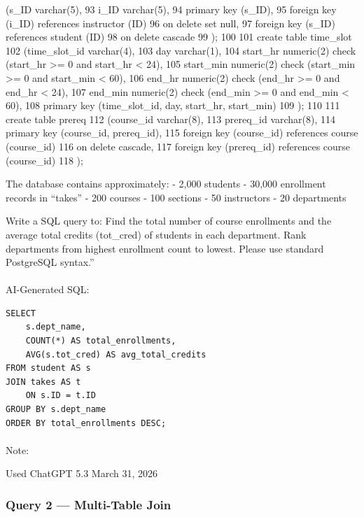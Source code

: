 \documentclass[
  letterpaper,
  DIV=11,
  numbers=noendperiod]{scrartcl}
\makeatletter
\let\oldparagraph\paragraph
\renewcommand{\paragraph}{
    \@ifstar
      \xxxParagraphStar
      \xxxParagraphNoStar
  }
\newcommand{\xxxParagraphStar}[1]{\oldparagraph*{#1}\mbox{}}
\newcommand{\xxxParagraphNoStar}[1]{\oldparagraph{#1}\mbox{}}
\makeatother
\begin{document}
(s\_ID varchar(5), 93 i\_ID varchar(5), 94 primary key (s\_ID), 95
foreign key (i\_ID) references instructor (ID) 96 on delete set null, 97
foreign key (s\_ID) references student (ID) 98 on delete cascade 99 );
100 101 create table time\_slot 102 (time\_slot\_id varchar(4), 103 day
varchar(1), 104 start\_hr numeric(2) check (start\_hr \textgreater= 0
and start\_hr \textless{} 24), 105 start\_min numeric(2) check
(start\_min \textgreater= 0 and start\_min \textless{} 60), 106 end\_hr
numeric(2) check (end\_hr \textgreater= 0 and end\_hr \textless{} 24),
107 end\_min numeric(2) check (end\_min \textgreater= 0 and end\_min
\textless{} 60), 108 primary key (time\_slot\_id, day, start\_hr,
start\_min) 109 ); 110 111 create table prereq 112 (course\_id
varchar(8), 113 prereq\_id varchar(8), 114 primary key (course\_id,
prereq\_id), 115 foreign key (course\_id) references course (course\_id)
116 on delete cascade, 117 foreign key (prereq\_id) references course
(course\_id) 118 );

The database contains approximately: - 2,000 students - 30,000
enrollment records in ``takes'' - 200 courses - 100 sections - 50
instructors - 20 departments

Write a SQL query to: Find the total number of course enrollments and
the average total credits (tot\_cred) of students in each department.
Rank departments from highest enrollment count to lowest. Please use
standard PostgreSQL syntax.''

\paragraph{AI-Generated SQL:}\label{ai-generated-sql}

\begin{verbatim}
SELECT
    s.dept_name,
    COUNT(*) AS total_enrollments,
    AVG(s.tot_cred) AS avg_total_credits
FROM student AS s
JOIN takes AS t
    ON s.ID = t.ID
GROUP BY s.dept_name
ORDER BY total_enrollments DESC;
\end{verbatim}

\paragraph{Note:}\label{note}

Used ChatGPT 5.3 March 31, 2026

\subsubsection{\texorpdfstring{\textbf{Query 2 --- Multi-Table
Join}}{Query 2 --- Multi-Table Join}}\label{query-2-multi-table-join}
\end{document}
